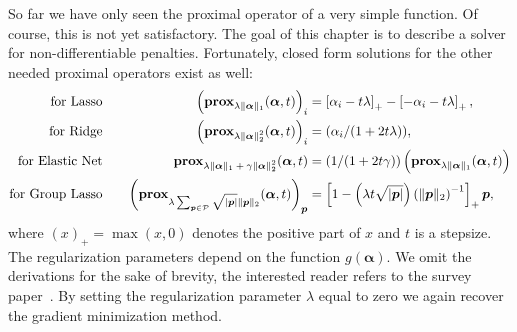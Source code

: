 So far we have only seen the proximal operator of a very simple function.
Of course, this is not yet satisfactory.
The goal of this chapter is to describe a solver for non-differentiable penalties.
Fortunately, closed form solutions for the other needed proximal operators exist as well:
\begin{align}
\label{eq:prox-lasso}
\text{for Lasso} \quad &&
    \left( \prox[\(\lambda \Vert \bm{\alpha} \Vert_1\)]{\bm{\alpha}}{t} \right)_i &= \left[\alpha_i - t \lambda \right]_+
    - \left[ -\alpha_i - t \lambda \right]_+, \\
\text{for Ridge} \quad &&
                          \left(  \prox[\( \lambda \Vert \bm{\alpha} \Vert_2^2\)]{\bm{\alpha}}{t} \right)_i &= (\alpha_i/(1 + 2t \lambda)), \nonumber\\
  \text{for Elastic Net} \quad && \prox[\( \lambda \Vert \bm{\alpha} \Vert_1 + \gamma \Vert \bm{\alpha} \Vert_2^2\)]{\bm{\alpha}}{t} &=
                                                                                                                                       \left( 1/(1 + 2 t \gamma) \right) \left(\prox[\(\lambda \Vert \bm{\alpha} \Vert_1\)]{\bm{\alpha}}{t}\right) \nonumber\\
  \text{for Group Lasso} \quad && {\left(\prox[\( \lambda \sum_{\bm{p} \in \mathcal{P}} \sqrt{\vert \bm{p} \vert} \Vert \bm{p} \Vert_2 \)]{\bm{\alpha}}{t} \right)}_{\bm{p}} &= 
                                                                                     \left[ 1 - \left(\lambda t \sqrt{\vert \bm{p} \vert}\right) \left( \Vert \bm{p} \Vert_2 \right)^{-1} \right]_+ \bm{p}, \nonumber
\end{align}
where \( \left( x \right)_+ = \max(x, 0) \) denotes the positive part of \(x\)
and \(t\) is a stepsize.
The regularization parameters depend on the function \(g(\bm{\alpha})\).
We omit the derivations for the sake of brevity, the interested reader refers to the survey paper~\cite{proxsurvey}.
By setting the regularization parameter \(\lambda\) equal to zero we again recover the gradient minimization method.

